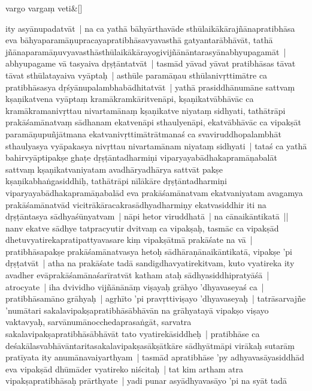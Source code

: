 \documentclass[article,12pt,a4paper]{memoir}%
\begin{document}
	    
	    \stanza[\smallbreak]
	  vargo vargaṃ veti\&[\smallbreak]
	  
	  
	  

	  
	  \pstart \leavevmode%
	\label{thakur75-130.19}ity asyānupadatvāt | na ca yathā bāhyārthavāde sthūlaikākārajñānapratibhāsa eva bāhyaparamāṇupracayapratibhāsavyavasthā gatyantarābhāvāt, tathā jñānaparamāṇuvyavasthāsthūlaikākārayogivijñānāntarasyānabhyupagamāt | abhyupagame vā tasyaiva dṛṣṭāntatvāt | tasmād yāvad yāvat pratibhāsas tāvat tāvat sthūlatayaiva vyāptaḥ | asthūle paramāṇau sthūlanivṛttimātre ca pratibhāsasya dṛśyānupalambhabādhitatvāt | yathā prasiddhānumāne sattvaṃ kṣaṇikatvena vyāptaṃ kramākramkāritvenāpi, kṣaṇikatvābhāvāc ca kramākramanivṛttau nivartamānaṃ kṣaṇikatve niyataṃ sidhyati, tathātrāpi prakāśamānatvaṃ sādhanam ekatvenāpi sthaulyenāpi, ekatvābhāvāc ca vipakṣāt paramāṇupuñjātmana ekatvanivṛttimātrātmanaś ca svaviruddhopalambhāt sthaulyasya vyāpakasya nivṛttau nivartamānam  niyataṃ sidhyati | tataś ca yathā bahirvyāptipakṣe ghaṭe dṛṣṭāntadharmiṇi viparyayabādhakapramāṇabalāt sattvaṃ kṣaṇikatvaniyatam avadhārya\label{ratnakīrtinibandhāvali__36r1PF7IMSPU9OV2Y47VRORIBMX}dhārya\label{ratnakīrtinibandhāvali__36r1PF7IMSNVGCLLFHWVZ63NZNW} sattvāt pakṣe kṣaṇikabhaṅgasiddhiḥ, tathātrāpi nīlākāre dṛṣṭāntadharmiṇi viparyayabādhakapramāṇabalād eva prakāśamānatvam ekatvaniyatam avagamya prakāśamānatvād vicitrākāracakrasādhyadharmiṇy ekatvasiddhir iti na dṛṣṭāntasya sādhyaśūnyatvam | nāpi hetor viruddhatā | na cānaikāntikatā || \label{thakur75-130.33} nanv ekatve sādhye tatpracyutir dvitvaṃ ca vipakṣaḥ, tasmāc ca vipakṣād dhetuvyatirekapratipattyavasare kiṃ vipakṣātmā prakāśate na vā | pratibhāsapakṣe prakāśamānatvasya hetoḥ sādhāraṇānaikāntikatā, vipakṣe 'pi dṛṣṭatvāt | atha na prakāśate tadā sandigdhavyatirekitvam, kuto vyatireka ity avadher evāprakāśamānaśarīratvāt katham ataḥ sādhyasiddhipratyāśā | \label{thakur75-131.4} atrocyate | iha dvividho vijñānānāṃ viṣayaḥ grāhyo 'dhyavaseyaś ca | pratibhāsamāno grāhyaḥ | agṛhīto 'pi pravṛttiviṣayo 'dhyavaseyaḥ | tatrāsarvajñe 'numātari sakalavipakṣapratibhāsābhāvān na grāhyatayā vipakṣo viṣayo vaktavyaḥ, sarvānumānocchedaprasaṅgāt, sarvatra sakalavipakṣapratibhāsābhāvāt tato vyatirekāsiddheḥ | pratibhāse ca deśakālasvabhāvāntaritasakalavipakṣasākṣātkāre sādhyātmāpi virākaḥ sutarāṃ pratīyata ity anumānavaiyarthyam | tasmād apratibhāse 'py adhyavasāyasiddhād eva vipakṣād dhūmāder vyatireko niścitaḥ | tat kim artham atra vipakṣapratibhāsaḥ prārthyate | yadi punar asyādhyavasāyo 'pi na syāt tadā 
\end{document}
